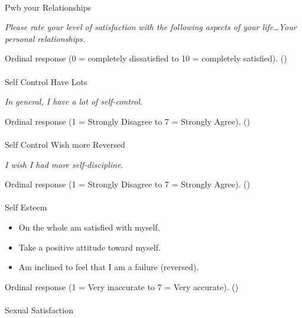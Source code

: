 \documentclass[
  single column]{article}
\makeatletter
\let\oldparagraph\paragraph
\renewcommand{\paragraph}{
    \@ifstar
      \xxxParagraphStar
      \xxxParagraphNoStar
  }
\newcommand{\xxxParagraphStar}[1]{\oldparagraph*{#1}\mbox{}}
\newcommand{\xxxParagraphNoStar}[1]{\oldparagraph{#1}\mbox{}}
\providecommand{\tightlist}{%
  \setlength{\itemsep}{0pt}\setlength{\parskip}{0pt}}\usepackage{longtable,booktabs,array}
\makeatother
\begin{document}
\paragraph{Pwb your Relationships}\label{pwb-your-relationships}

\emph{Please rate your level of satisfaction with the following aspects
of your life\ldots Your personal relationships.}

Ordinal response (0 = completely dissatisfied to 10 = completely
satisfied). ()

\paragraph{Self Control Have Lots}\label{self-control-have-lots}

\emph{In general, I have a lot of self-control.}

Ordinal response (1 = Strongly Disagree to 7 = Strongly Agree).
()

\paragraph{Self Control Wish more
Reversed}\label{self-control-wish-more-reversed}

\emph{I wish I had more self-discipline.}

Ordinal response (1 = Strongly Disagree to 7 = Strongly Agree).
()

\paragraph{Self Esteem}\label{self-esteem}

\begin{itemize}
\tightlist
\item
  On the whole am satisfied with myself.
\item
  Take a positive attitude toward myself.
\item
  Am inclined to feel that I am a failure (reversed).
\end{itemize}

Ordinal response (1 = Very inaccurate to 7 = Very accurate).
()

\paragraph{Sexual Satisfaction}\label{sexual-satisfaction-1}
\end{document}
